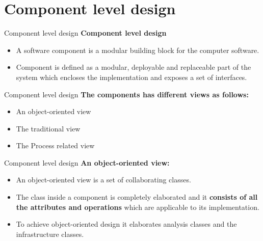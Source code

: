 \documentclass{beamer}
\begin{document}
\section{ Component level design }
\begin{frame}{Component level design }
	\textbf{Component level design }
	\begin{itemize}
		\item A software component is a modular building block for the computer software.
		\item Component is defined as a modular, deployable and replaceable part of the system which encloses the implementation and exposes a set of interfaces.
	\end{itemize}
\end{frame}
\begin{frame}{Component level design }
	\textbf{The components has different views as follows:}
	\begin{itemize}
		\item An object-oriented view
		\item The traditional view
		\item The Process related view
	\end{itemize}
\end{frame}
\begin{frame}{Component level design }
	\textbf{An object-oriented view:}
	\begin{itemize}
		\item An object-oriented view is a set of collaborating classes.
		\item The class inside a component is completely elaborated and it \textbf{consists of all the attributes and operations} which are applicable to its implementation.
		\item To achieve object-oriented design it elaborates analysis classes and the infrastructure classes.
	\end{itemize}
\end{frame}
\end{document}
